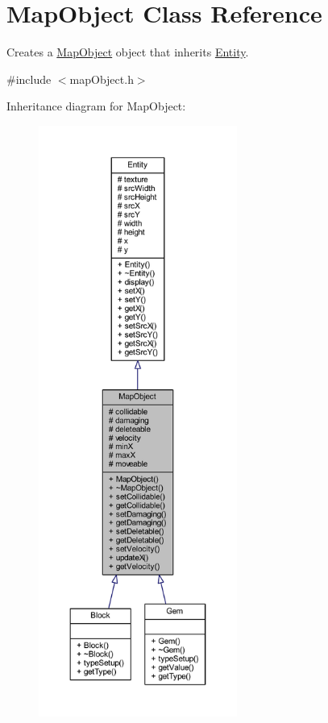 \hypertarget{class_map_object}{\section{Map\+Object Class Reference}
\label{class_map_object}
}


Creates a \hyperlink{class_map_object}{Map\+Object} object that inherits \hyperlink{class_entity}{Entity}.  




{\ttfamily \#include $<$map\+Object.\+h$>$}



Inheritance diagram for Map\+Object\+:
\nopagebreak
\begin{figure}[H]
\begin{center}
\leavevmode
\includegraphics[height=550pt]{class_map_object__inherit__graph}
\end{center}
\end{figure}


